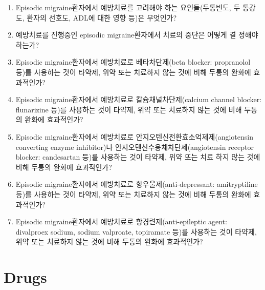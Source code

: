 \documentclass[]{book}
\begin{document}
\begin{enumerate}
\def\labelenumi{\arabic{enumi}.}
\item
  Episodic migraine환자에서 예방치료를 고려해야 하는 요인들(두통빈도, 두 통강도, 환자의 선호도, ADL에 대한 영향 등)은 무엇인가?
\item
  예방치료를 진행중인 episodic migraine환자에서 치료의 중단은 어떻게 결 정해야 하는가?
\item
  Episodic migraine환자에서 예방치료로 베타차단제(beta blocker: propranolol 등)를 사용하는 것이 타약제, 위약 또는 치료하지 않는 것에 비해 두통의 완화에 효과적인가?
\item
  Episodic migraine환자에서 예방치료로 칼슘채널차단제(calcium channel blocker: flunarizine 등)를 사용하는 것이 타약제, 위약 또는 치료하지 않는 것에 비해 두통의 완화에 효과적인가?
\item
  Episodic migraine환자에서 예방치료로 안지오텐신전환효소억제제(angiotensin converting enzyme inhibitor)나 안지오텐신수용체차단제(angiotensin receptor blocker: candesartan 등)를 사용하는 것이 타약제, 위약 또는 치료 하지 않는 것에 비해 두통의 완화에 효과적인가?
\item
  Episodic migraine환자에서 예방치료로 항우울제(anti-depressant: amitryptiline 등)를 사용하는 것이 타약제, 위약 또는 치료하지 않는 것에 비해 두통의 완화에 효과적인가?
\item
  Episodic migraine환자에서 예방치료로 항경련제(anti-epileptic agent: divalproex sodium, sodium valproate, topiramate 등)를 사용하는 것이 타약제, 위약 또는 치료하지 않는 것에 비해 두통의 완화에 효과적인가?
\end{enumerate}

\hypertarget{drugs}{%
\section{Drugs}\label{drugs}}
\end{document}
